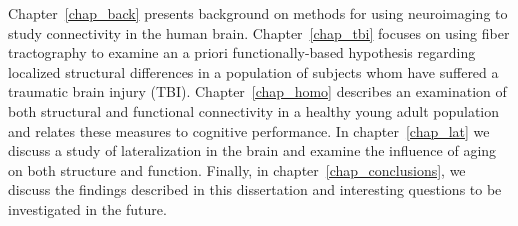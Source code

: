 Chapter~\ref{chap_back} presents background on methods for using neuroimaging to study connectivity in the human brain.  Chapter~\ref{chap_tbi} focuses on using fiber tractography to examine an a priori functionally-based hypothesis regarding localized structural differences in a population of subjects whom have suffered a traumatic brain injury (TBI). Chapter~\ref{chap_homo} describes an examination of both structural and functional connectivity in a healthy young adult population and relates these measures to cognitive performance. In chapter~\ref{chap_lat} we discuss a study of lateralization in the brain and examine the influence of aging on both structure and function. Finally, in chapter~\ref{chap_conclusions}, we discuss the findings described in this dissertation and interesting questions to be investigated in the future.





%
%
%
%
%
%




